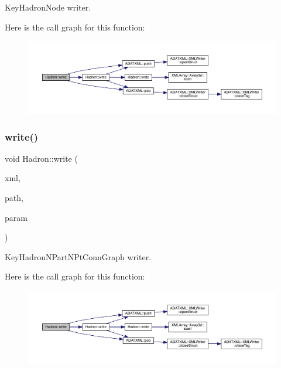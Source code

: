 Key\+Hadron\+Node writer. 

Here is the call graph for this function\+:
\nopagebreak
\begin{figure}[H]
\begin{center}
\leavevmode
\includegraphics[width=350pt]{d1/daf/namespaceHadron_aa7f9575393c93afa7db5f164da5c31eb_cgraph}
\end{center}
\end{figure}
\mbox{\label{namespaceHadron_a25da56def6a3cbbe579c9b7b4d27e848}} 
\subsubsection{\texorpdfstring{write()}{write()}\hspace{0.1cm}{\footnotesize\ttfamily [67/95]}}
{\footnotesize\ttfamily void Hadron\+::write (\begin{DoxyParamCaption}\item[{\mbox{\hyperlink{classADATXML_1_1XMLWriter}{X\+M\+L\+Writer}} \&}]{xml,  }\item[{const std\+::string \&}]{path,  }\item[{const \mbox{\hyperlink{structHadron_1_1KeyHadronNPartNPtConnGraph__t}{Key\+Hadron\+N\+Part\+N\+Pt\+Conn\+Graph\+\_\+t}} \&}]{param }\end{DoxyParamCaption})}



Key\+Hadron\+N\+Part\+N\+Pt\+Conn\+Graph writer. 

Here is the call graph for this function\+:
\nopagebreak
\begin{figure}[H]
\begin{center}
\leavevmode
\includegraphics[width=350pt]{d1/daf/namespaceHadron_a25da56def6a3cbbe579c9b7b4d27e848_cgraph}
\end{center}
\end{figure}
\mbox{\label{namespaceHadron_a4e777dd6c1ccf60b80a383fd5901627b}} 
